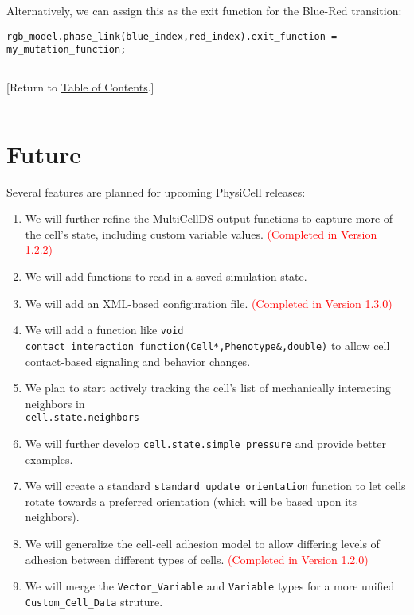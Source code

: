 \documentclass[12pt]{article}
\renewcommand{\v}{\verb}
\newcommand{\red}[1]{\textcolor{red}{#1}}
\newcommand{\TOClink}{\begin{center}\hrule\vskip-10pt\phantom{.}\hfill[Return to \hyperlink{TOC}{Table of Contents}.]\hfill\phantom{.}\vskip3pt\hrule\end{center}}
\begin{document}
Alternatively, we can assign this as the exit function for the Blue-Red transition: 
\begin{verbatim}
rgb_model.phase_link(blue_index,red_index).exit_function = my_mutation_function; 
\end{verbatim}
\TOClink 


\section{Future}
\label{sec:Future_Plans}
Several features are planned for upcoming PhysiCell releases: 
\begin{enumerate}
\item 
We will further refine the MultiCellDS output functions to capture 
more of the cell's state, including custom variable values. 
\red{(Completed in Version 1.2.2)}

\item 
We will add functions to read in a saved simulation state. 

\item 
We will add an XML-based configuration file. 
\red{(Completed in Version 1.3.0)}

\item 
We will add a function like 
\v|void contact_interaction_function(Cell*,Phenotype&,double)| 
to allow cell contact-based signaling and behavior changes. 

\item 
We plan to start actively tracking the cell's list of mechanically interacting neighbors in \\
\v|cell.state.neighbors|

\item 
We will further develop \v|cell.state.simple_pressure| and provide better examples. 

\item
We will create a standard \v|standard_update_orientation| function to 
let cells rotate towards a preferred orientation (which will be based upon 
its neighbors). 

\item 
We will generalize the cell-cell adhesion model to allow differing levels of adhesion 
between different types of cells. \red{(Completed in Version 1.2.0)} 

\item 
We will merge the \v|Vector_Variable| and \v|Variable| types for a more unified 
\v|Custom_Cell_Data| struture. 


\end{enumerate}
\end{document}

